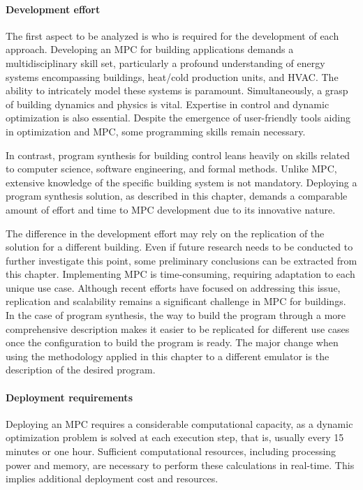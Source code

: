 \paragraph{Development effort}
The first aspect to be analyzed is who is required for the development of each approach. 
Developing an MPC for building applications demands a multidisciplinary skill set, particularly a profound understanding of energy systems encompassing buildings, heat/cold production units, and HVAC. The ability to intricately model these systems is paramount. Simultaneously, a grasp of building dynamics and physics is vital. Expertise in control and dynamic optimization is also essential. Despite the emergence of user-friendly tools aiding in optimization and MPC, some programming skills remain necessary. 

In contrast, program synthesis for building control leans heavily on skills related to computer science, software engineering, and formal methods. Unlike MPC, extensive knowledge of the specific building system is not mandatory. Deploying a program synthesis solution, as described in this  chapter, demands a comparable amount of effort and time to MPC development due to its innovative nature.

The difference in the development effort may rely on the replication of the solution for a different building. Even if future research needs to be conducted to further investigate this point, some preliminary conclusions can be extracted from this chapter. Implementing MPC is time-consuming, requiring adaptation to each unique use case. Although recent efforts have focused on addressing this issue, replication and scalability remains a significant challenge in MPC for buildings. In the case of program synthesis, the way to build the program through a more comprehensive description makes it easier to be replicated for different use cases once the configuration to build the program is ready. The major change when using the methodology applied in this  chapter to a different emulator is the description of the desired program.

\paragraph{Deployment requirements}
Deploying an MPC requires a considerable computational capacity, as a dynamic optimization problem is solved at each execution step, that is, usually every 15 minutes or one hour. Sufficient computational resources, including processing power and memory, are necessary to perform these calculations in real-time. This implies additional deployment cost and resources.

